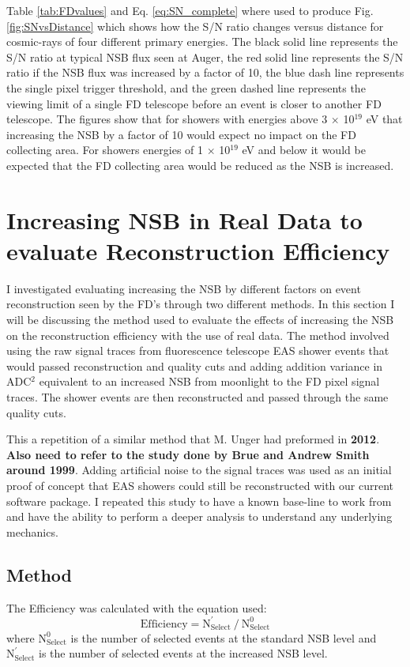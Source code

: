 Table \ref{tab:FDvalues} and Eq. \ref{eq:SN_complete} where used to produce Fig. \ref{fig:SNvsDistance} which shows how the S/N ratio changes versus distance for cosmic-rays of four different primary energies. The black solid line represents the S/N ratio at typical NSB flux seen at Auger, the red solid line represents the S/N ratio if the NSB flux was increased by a factor of 10, the blue dash line represents the single pixel trigger threshold, and the green dashed line represents the viewing limit of a single FD telescope before an event is closer to another FD telescope. The figures show that for showers with energies above 3 $\times$ 10$^{19}$ eV that increasing the NSB by a factor of 10 would expect no impact on the FD collecting area. For showers energies of 1 $\times$ 10$^{19}$ eV and below it would be expected that the FD collecting area would be reduced as the NSB is increased.



\section{Increasing NSB in Real Data to evaluate Reconstruction Efficiency}


I investigated evaluating increasing the NSB by different factors on event reconstruction seen by the FD's through two different methods. In this section I will be discussing the method used to evaluate the effects of increasing the NSB on the reconstruction efficiency with the use of real data. The method involved using the raw signal traces from fluorescence telescope EAS shower events that would passed reconstruction and quality cuts and adding addition variance in ADC$^2$ equivalent to an increased NSB from moonlight to the FD pixel signal traces.  The shower events are then reconstructed and passed through the same quality cuts. 

This a repetition of a similar method that M. Unger had preformed in \textbf{2012}. \textbf{Also need to refer to the study done by Brue and Andrew Smith around 1999}. Adding artificial noise to the signal traces was used as an initial proof of concept that EAS showers could still be reconstructed with our current software package. I repeated this study to have a known base-line to work from and have the ability to perform a deeper analysis to understand any underlying mechanics. 

\subsection{Method}
 The Efficiency was calculated with the equation used:
\begin{equation}
\mathrm{Efficiency} = \mathrm{N}^{'}_{\mathrm{Select}} \ / \ \mathrm{N}^0_{\mathrm{Select}}
\end{equation}
where $\mathrm{N}^{0}_{\mathrm{Select}}$ is the number of selected events at the standard NSB level and $\mathrm{N}^{'}_{\mathrm{Select}}$ is the number of selected events at the increased NSB
level. 

